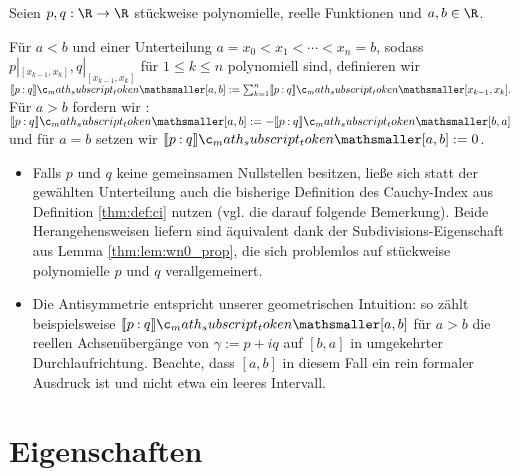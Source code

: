 \documentclass{mythesis}
\begin{document}
\begin{definition} \label{thm:def:ci_pwpoly}
    Seien $p, q: \R \to \R$ stückweise polynomielle, reelle Funktionen und $a, b \in \nobreak \R$.

    Für $a < b$ und einer Unterteilung $a = x_0 < x_1 < \dotsb < x_n = b$, sodass $p|_{[x_{k-1}, x_k]}, q|_{[x_{k-1}, x_k]}$ für $1 \le k \le n$ polynomiell sind, definieren wir
    \begin{math}
        \Index{[a,b]}{p}{q}
        := \sum_{k=1}^n \Index{[x_{k-1}, x_k]}{p}{q}.
    \end{math}
    Für $a > b$ fordern wir : $\Index{[a,b]}{p}{q} := -\Index{[b,a]}{p}{q}$ und für $a = b$ setzen wir $\Index{[a,b]}{p}{q} := 0$.
    \begin{note}
        \begin{itemize}
            \item
                Falls $p$ und $q$ keine gemeinsamen Nullstellen besitzen, ließe sich statt der gewählten Unterteilung auch die bisherige Definition des Cauchy-Index aus Definition \ref{thm:def:ci} nutzen (vgl. die darauf folgende Bemerkung).
                Beide Herangehensweisen liefern sind äquivalent dank der Subdivisions-Eigenschaft aus Lemma \ref{thm:lem:wn0_prop}, die sich problemlos auf stückweise polynomielle $p$ und $q$ verallgemeinert.
            \item
                Die Antisymmetrie entspricht unserer geometrischen Intuition: so zählt beispielsweise $\Index{[a,b]}{p}{q}$ für $a > b$ die reellen Achsenübergänge von $\gamma := p + iq$ auf $[b, a]$ in umgekehrter Durchlaufrichtung.
                Beachte, dass $[a,b]$ in diesem Fall ein rein formaler Ausdruck ist und nicht etwa ein leeres Intervall.
        \end{itemize}
    \end{note}
\end{definition}


%
%



\section{Eigenschaften}
\end{document}
